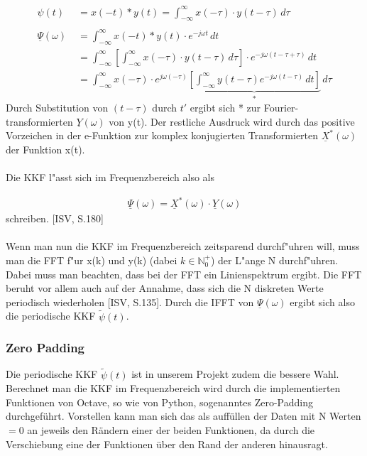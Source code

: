 \begin{align}
\psi(t) \  \; &= x(-t) * y(t) = \int_{-\infty}^{\infty} x(-\tau) \cdot y(t-\tau)\,d\tau\\\\
\underline \Psi(\omega) &=\int_{-\infty}^{\infty} x(-t) * y(t) \cdot e^{-j\omega t} \,dt\\&=\int_{-\infty}^{\infty} \left[ \int_{-\infty}^{\infty} x(-\tau) \cdot y(t-\tau)\,d\tau \right] \cdot e^{-j\omega (t - \tau + \tau)} \,dt\\&=\int_{-\infty}^{\infty} x(-\tau) \cdot e^{j\omega(-\tau)} \underbrace{ \left[ \int_{-\infty}^{\infty} y(t-\tau) e^{-j\omega (t - \tau)} \,dt \right]}_* \,d\tau
\end{align}
Durch Substitution von $(t-\tau)$ durch $t'$ ergibt sich * zur Fourier-transformierten $ \underline{Y}(\omega)$ von y(t). Der restliche Ausdruck wird durch das positive Vorzeichen in der e-Funktion zur komplex konjugierten Transformierten $ \underline{X}^*(\omega)$ der Funktion x(t).
\\\\
Die KKF l"asst sich im Frequenzbereich also als

\begin{align}
\boxed{\underline \Psi(\omega) = \underline{X}^*(\omega) \cdot \underline{Y}(\omega)}
\end{align}
schreiben. [ISV, S.180]
\\\\
Wenn man nun die KKF im Frequenzbereich zeitsparend durchf"uhren will, muss man die FFT f"ur x(k) und y(k) (dabei $k \in \mathbb{N}^+_0$) der L"ange N durchf"uhren. Dabei muss man beachten, dass bei der FFT ein Linienspektrum ergibt. Die FFT beruht vor allem auch auf der Annahme, dass sich die N diskreten Werte periodisch wiederholen [ISV, S.135]. Durch die IFFT von $ \underline \Psi(\omega)$ ergibt sich also die periodische KKF $\tilde{\psi}(t)$.
\subsubsection{Zero Padding}
Die periodische KKF $\tilde{\psi}(t)$ ist in unserem Projekt zudem die bessere Wahl. Berechnet man die KKF im Frequenzbereich wird durch die implementierten Funktionen von Octave, so wie von Python, sogenanntes Zero-Padding durchgeführt. Vorstellen kann man sich das als auffüllen der Daten mit N Werten $=0$ an jeweils den Rändern einer der beiden Funktionen, da durch die Verschiebung eine der Funktionen über den Rand der anderen hinausragt.

